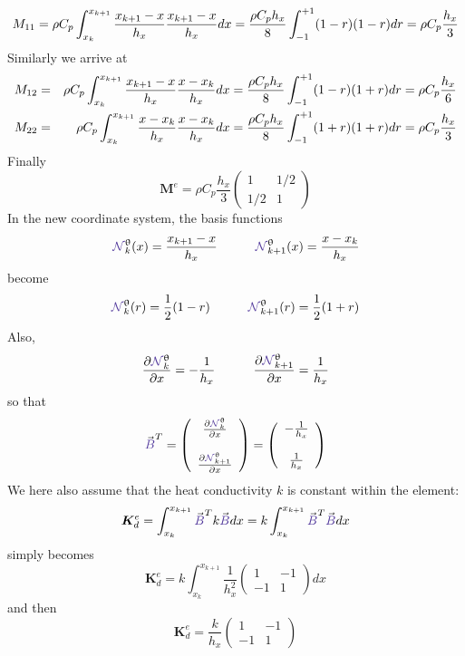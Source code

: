 \[
M_{11}=
\rho C_p
\int_{\tiny x_k}^{x_{k+1}} 
\frac{x_{k+1}-x}{h_x}  
\frac{x_{k+1}-x}{h_x}  
dx
=  \frac{\rho C_p h_x}{8} \int_{-1}^{+1} (1-r) (1-r)  dr  = \rho C_p \frac{h_x}{3} 
\]
Similarly we arrive at 
\begin{eqnarray}
M_{12}
&=&\rho C_p 
\int_{x_k}^{x_{k+1}} 
\frac{x_{k+1}-x}{h_x}  
\frac{x-x_k}{h_x}  
dx
=
\frac{\rho C_p  h_x}{8} 
\int_{-1}^{+1} (1-r) (1+r)dr
= \rho C_p\frac{h_x}{6}  \nonumber\\
M_{22}
&=&
\rho C_p 
\int_{x_k}^{x_{k+1}} 
\frac{x-x_k}{h_x}  
\frac{x-x_k}{h_x}  
dx
=
\frac{\rho C_p  h_x}{8} 
\int_{-1}^{+1} (1+r) (1+r)dr
= \rho C_p \frac{h_x}{3} \nonumber 
\end{eqnarray}
Finally 
\[
\boxed{
{\bm M}^e= \rho C_p \frac{h_x}{3}   
\left(
\begin{array}{cc}
1  & 1/2 \\
1/2 & 1
\end{array}
\right)
}
\]
In the new coordinate system, the {\color{olive}basis functions} 
\[
{\color{Violet}\bN}_k^\uptheta(x) = \frac{x_{k+1}-x}{h_x} 
\quad
\quad
\quad
{\color{Violet}\bN}_{k+1}^\uptheta(x) = \frac{x-x_k}{h_x} 
\]
become 
\[
{\color{Violet}\bN}_k^\uptheta(r) = \frac{1}{2} (1-r)
\quad
\quad
\quad
{\color{Violet}\bN}_{k+1}^\uptheta(r) = \frac{1}{2} (1+r)
\]
Also, 
\[
\frac{\partial {\color{Violet}\bN}_k^\uptheta}{\partial x} = - \frac{1}{h_x} 
\quad
\quad
\quad
\frac{\partial {\color{Violet}\bN}_{k+1}^\uptheta}{\partial x} = \frac{1}{h_x} 
\]
so that 
\[
{\vec {\color{Violet}B}}^T=
\left(
\begin{array}{cc}
 \frac{\partial {\color{Violet}\bN}_k^\uptheta}{\partial x}   \\ \\
 \frac{\partial {\color{Violet}\bN}_{k+1}^\uptheta}{\partial x}
\end{array}
\right)
=
\left(
\begin{array}{cc}
-\frac{1}{h_x} \\ \\
\frac{1}{h_x} 
\end{array}
\right)
\]
We here also assume that the heat conductivity $k$ is constant within the element:
\[
{\bm K}_d^e =
\int_{x_k}^{x_{k+1}}   {\vec {\color{Violet}B}}^T k {\vec {\color{Violet}B}} dx 
= k \int_{x_k}^{x_{k+1}}   {\vec {\color{Violet}B}}^T {\vec {\color{Violet}B}} dx 
\]
simply becomes
\[
{\bm K}_d^e = k
 \int_{x_k}^{x_{k+1}} 
\frac{1}{h_x^2}
\left(
\begin{array}{cc}
1 & -1 \\ -1 & 1
\end{array}
\right)
dx
\]
and then
\[
\boxed{
{\bm K}_d^e =
\frac{k}{h_x}
\left(
\begin{array}{cc}
1 & -1 \\ -1 & 1
\end{array}
\right)
}
\]

